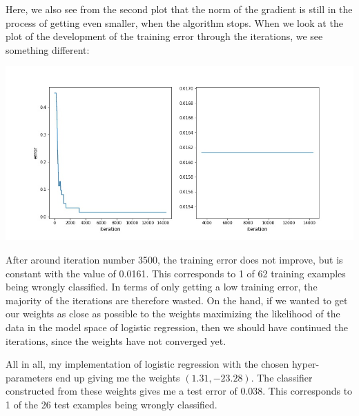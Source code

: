 Here, we also see from the second plot that the norm of the gradient is still in the process of getting even smaller, when the algorithm stops. When we look at the plot of the development of the training error through the iterations, we see something different:
\begin{center}
\includegraphics[scale=0.4]{logistic_regression/errorplot.jpg}
\end{center}
After around iteration number 3500, the training error does not improve, but is constant with the value of 0.0161. This corresponds to 1 of 62 training examples being wrongly classified. In terms of only getting a low training error, the majority of the iterations are therefore wasted. On the hand, if we wanted to get our weights as close as possible to the weights maximizing the likelihood of the data in the model space of logistic regression, then we should have continued the iterations, since the weights have not converged yet.

All in all, my implementation of logistic regression with the chosen hyper-parameters end up giving me the weights $(1.31, -23.28)$. The classifier constructed from these weights gives me a test error of 0.038. This corresponds to 1 of the 26 test examples being wrongly classified.
